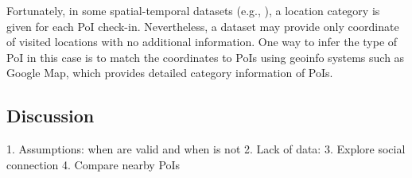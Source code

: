 Fortunately, in some spatial-temporal datasets (e.g., \cite{yang2015nationtelescope}), a location category is given for each PoI check-in. Nevertheless, a dataset may provide only coordinate of visited locations with no additional information. One way to infer the type of PoI in this case is to match the coordinates to PoIs using geoinfo systems such as Google Map, which provides detailed category information of PoIs.

\subsection{Discussion}
1. Assumptions: when are valid and when is not
2. Lack of data: 
3. Explore social connection
4. Compare nearby PoIs
